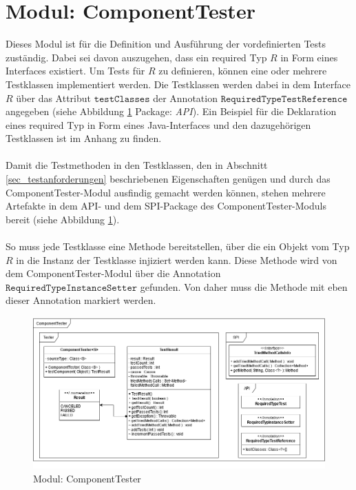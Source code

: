 {{\section{Modul: ComponentTester}
Dieses Modul ist für die Definition und Ausführung der vordefinierten Tests zuständig. Dabei sei davon auszugehen, dass ein required Typ $R$ in Form eines Interfaces existiert. Um Tests für $R$ zu definieren, können eine oder mehrere Testklassen implementiert werden. Die Testklassen werden dabei in dem Interface $R$ über das Attribut $\texttt{testClasses}$ der Annotation $\texttt{RequiredTypeTestReference}$ angegeben (siehe Abbildung \ref{fig_cdCompTester} Package: \emph{API}). Ein Beispiel für die Deklaration eines required Typ in Form eines Java-Interfaces und den dazugehörigen Testklassen ist im Anhang zu finden.
\\\\
Damit die Testmethoden in den Testklassen, den in Abschnitt \ref{sec_testanforderungen} beschriebenen Eigenschaften genügen und durch das ComponentTester-Modul ausfindig gemacht werden können, stehen mehrere Artefakte in dem API- und dem SPI-Package des ComponentTester-Moduls bereit (siehe Abbildung \ref{fig_cdCompTester}).
\\\\
So muss jede Testklasse eine Methode bereitstellen, über die ein Objekt vom Typ $R$ in die Instanz der Testklasse injiziert werden kann. Diese Methode wird von dem ComponentTester-Modul über die Annotation $\texttt{RequiredTypeInstanceSetter}$ gefunden. Von daher muss die Methode mit eben dieser Annotation markiert werden.
\begin{figure}
\centering
\includegraphics[scale=0.5]{pics/cd_ComponentTester.png}
\caption{Modul: ComponentTester}
\label{fig_cdCompTester}
\end{figure}
\\\\
}}
